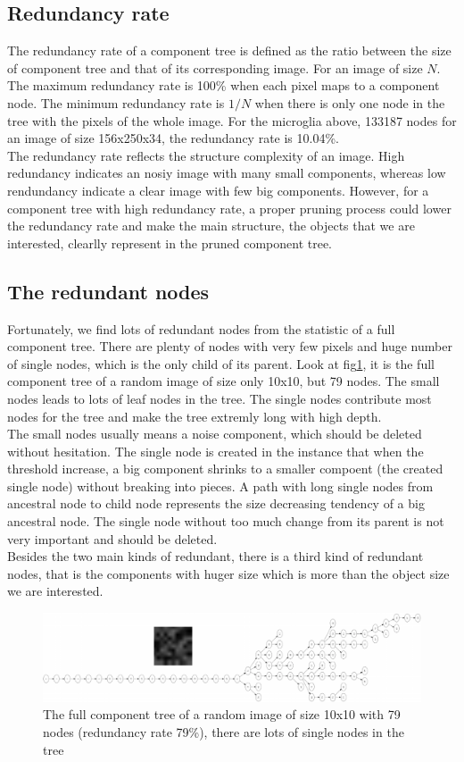 \subsection{Redundancy rate}
The redundancy rate of a component tree is defined as the ratio between the size of component tree and that of its corresponding image. For an image of size $N$. The maximum redundancy rate is 100\% when each pixel maps to a component node. The minimum redundancy rate is $1/N$ when there is only one node in the tree with the pixels of the whole image. For the microglia above, 133187 nodes for an image of size 156x250x34, the redundancy rate is 10.04\%.\\
The redundancy rate reflects the structure complexity of an image. High redundancy indicates an nosiy image with many small components, whereas low rendundancy indicate a clear image with few big components. However, for a component tree with high redundancy rate, a proper pruning process could lower the redundancy rate and make the main structure, the objects that we are interested, clearlly represent in the pruned component tree.
\subsection{The redundant nodes}
Fortunately, we find lots of redundant nodes from the statistic of a full component tree. There are plenty of nodes with very few pixels and huge number of single nodes, which is the only child of its parent. Look at fig\ref{fig:cptree-random}, it is the full component tree of a random image of size only 10x10, but 79 nodes. The small nodes leads to lots of leaf nodes in the tree. The single nodes contribute most nodes for the tree and make the tree extremly long with high depth. \\
The small nodes usually means a noise component, which should be deleted without hesitation. The single node is created in the instance that when the threshold increase, a big component shrinks to a smaller compoent (the created single node) without breaking into pieces. A path with long single nodes from ancestral node to child node represents the size decreasing tendency of a big ancestral node. The single node without too much change from its parent is not very important and should be deleted.\\
Besides the two main kinds of redundant, there is a third kind of redundant nodes, that is the components with huger size which is more than the object size we are interested. 
\begin{figure}[htbp]
\centering
\includegraphics[width=1.0\textwidth]{images/cptree_random}
\caption{The full component tree of a random image of size 10x10 with 79 nodes (redundancy rate 79\%), there are lots of single nodes in the tree}
\label{fig:cptree-random}
\end{figure}

